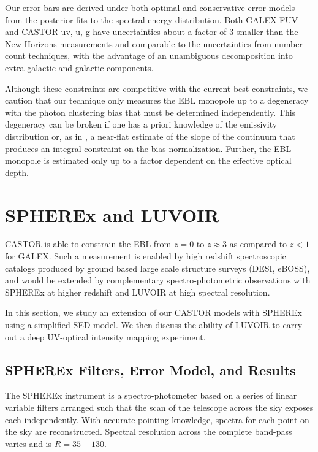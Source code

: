 \documentclass[fleqn,usenatbib]{mnras}
\begin{document}
Our error bars are derived under both optimal and conservative error models from the posterior fits to the spectral energy distribution. Both {\small GALEX} FUV and {\small CASTOR} uv, u, g have uncertainties about a factor of 3 smaller than the New Horizons measurements and comparable to the uncertainties from number count techniques, with the advantage of an unambiguous decomposition into extra-galactic and galactic components. 

Although these constraints are competitive with the current best constraints, we caution that our technique only measures the EBL monopole up to a degeneracy with the photon clustering bias that must be determined independently. This degeneracy can be broken if one has a priori knowledge of the emissivity distribution or, as in \cite{Chiang_2019}, a near-flat estimate of the slope of the continuum that produces an integral constraint on the bias normalization. Further, the EBL monopole is estimated only up to a factor dependent on the effective optical depth. 


\section{SPHEREx and LUVOIR}
\label{sec:spherex}

{\small CASTOR} is able to constrain the EBL from $z= 0$ to $z \approx 3$ as compared to $z < 1$ for GALEX. Such a measurement is enabled by high redshift spectroscopic catalogs produced by ground based large scale structure surveys (DESI, eBOSS), and would be extended by complementary spectro-photometric observations with {\small SPHEREx} at higher redshift and {\small LUVOIR} at high spectral resolution.

In this section, we study an extension of our {\small CASTOR} models with {\small SPHEREx} using a simplified SED model. We then discuss the ability of {\small LUVOIR} to carry out a deep UV-optical intensity mapping experiment.

\subsection{SPHEREx Filters, Error Model, and Results}
\label{SPHEREx_results}

The {\small SPHEREx} instrument is a spectro-photometer based on a series of linear variable filters arranged such that the scan of the telescope across the sky exposes each independently. With accurate pointing knowledge, spectra for each point on the sky are reconstructed. Spectral resolution across the complete band-pass varies and is $R = 35 - 130$. 
\end{document}

